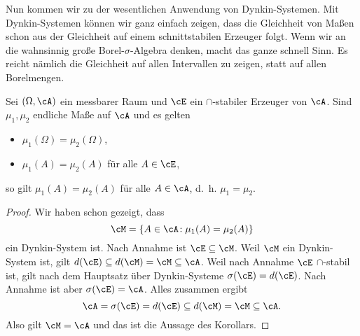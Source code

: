 Nun kommen wir zu der wesentlichen Anwendung von Dynkin-Systemen. Mit Dynkin-Systemen k\"onnen wir ganz einfach zeigen, dass die Gleichheit von Ma\ss en schon aus der Gleichheit auf einem schnittstabilen Erzeuger folgt. Wenn wir an die wahnsinnig gro\ss e Borel-$\sigma$-Algebra denken, macht das ganze schnell Sinn. Es reicht n\"amlich die Gleichheit auf allen Intervallen zu zeigen, statt auf allen Borelmengen.
\begin{korollar}\label{Dynkin-Folgerung}
	Sei $(\Omega, \cA)$ ein messbarer Raum und $\cE$ ein $\cap$-stabiler Erzeuger von $\cA$. Sind $\mu_1,\mu_2$ endliche Maße auf $\cA$ und es gelten
	\begin{itemize}
		\item $\mu_1(\Omega)=\mu_2(\Omega)$,
		\item $\mu_1(A) = \mu_2(A)$ für alle $A \in \cE$, 
	\end{itemize}
	so gilt $\mu_1(A) = \mu_2(A)$ für alle $A \in \cA$, \mbox{d. h.} $\mu_1 = \mu_2$.
\end{korollar}

\begin{proof}
	Wir haben schon gezeigt, dass
	\[ \cM = \{ A \in \cA \! : \mu_1(A) = \mu_2(A) \} \] ein Dynkin-System ist. Nach Annahme ist $\cE \subseteq \cM$. Weil $\cM$ ein Dynkin-System ist, gilt $d(\cE) \subseteq d(\cM) = \cM \subseteq \cA$. Weil nach Annahme $\cE$ $\cap$-stabil ist, gilt nach dem Hauptsatz \"uber Dynkin-Systeme $\sigma(\cE) = d(\cE)$. Nach Annahme ist aber $\sigma(\cE) = \cA$. Alles zusammen ergibt \[ \cA = \sigma(\cE) = d(\cE) \subseteq d(\cM) = \cM \subseteq \cA. \] Also gilt $\cM = \cA$ und das ist die Aussage des Korollars.
\end{proof}

